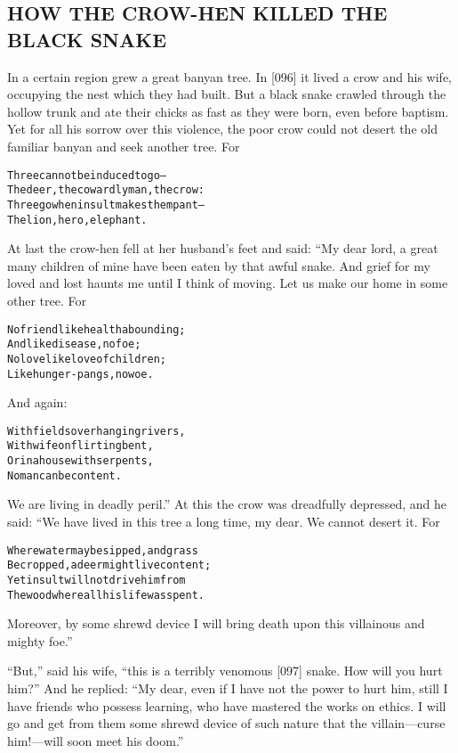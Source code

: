 \documentclass{article}
\renewenvironment{verbatim}{\begin{alltt}\normalfont\begin{centering}}{\end{centering}\end{alltt}}
\begin{document}
\subsection{HOW THE CROW-HEN KILLED THE BLACK SNAKE}

In a certain region grew a great banyan tree. In [096] it lived a
crow and his wife, occupying the nest which they had built. But a
black snake crawled through the hollow trunk and ate their chicks
as fast as they were born, even before baptism. Yet for all his
sorrow over this violence, the poor crow could not desert the old
familiar banyan and seek another tree. For

\begin{verbatim}
Three cannot be induced to go--
The deer, the cowardly man, the crow:
Three go when insult makes them pant--
The lion, hero, elephant.
\end{verbatim}
At last the crow-hen fell at her husband's feet and said: “My dear
lord, a great many children of mine have been eaten by that awful
snake. And grief for my loved and lost haunts me until I think of
moving. Let us make our home in some other tree. For

\begin{verbatim}
No friend like health abounding;
    And like disease, no foe;
No love like love of children;
    Like hunger-pangs, no woe.
\end{verbatim}
And again:

\begin{verbatim}
With fields overhanging rivers,
    With wife on flirting bent,
Or in a house with serpents,
    No man can be content.
\end{verbatim}
We are living in deadly peril.” At this the crow was dreadfully
depressed, and he said: “We have lived in this tree a long time, my
dear. We cannot desert it. For

\begin{verbatim}
Where water may be sipped, and grass
    Be cropped, a deer might live content;
Yet insult will not drive him from
    The wood where all his life was spent.
\end{verbatim}
Moreover, by some shrewd device I will bring death upon this
villainous and mighty foe.”

``But,'' said his wife,
``this is a terribly venomous [097] snake. How will you hurt him?''
And he replied:
``My dear, even if I have not the power to hurt him, still I have friends who possess learning, who have mastered the works on ethics. I will go and get from them some shrewd device of such nature that the villain---curse him!---will soon meet his doom.''
\end{document}
